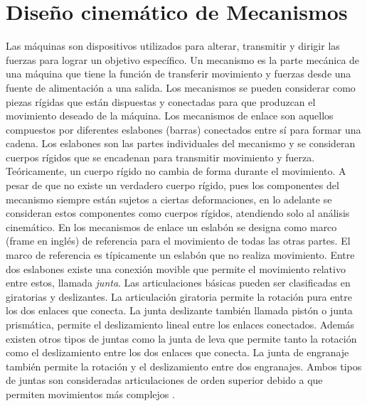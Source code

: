 \section{Diseño cinemático de Mecanismos}\label{sec: Diseño cinemático de Mecanismos}
Las máquinas son dispositivos utilizados para alterar, transmitir y dirigir las fuerzas para lograr un objetivo específico. Un mecanismo es la parte mecánica de una máquina que tiene la función de transferir movimiento y fuerzas desde una fuente de alimentación a una salida. Los mecanismos se pueden considerar como piezas rígidas que están dispuestas y conectadas para que produzcan el movimiento deseado de la máquina. Los mecanismos de enlace son aquellos compuestos por diferentes eslabones (barras) conectados entre sí para formar una cadena. Los eslabones son las partes individuales del mecanismo y se consideran cuerpos rígidos que se encadenan  para transmitir movimiento y fuerza. Teóricamente, un cuerpo rígido no cambia de forma durante el movimiento. A pesar de que no existe un verdadero cuerpo rígido, pues los componentes del mecanismo siempre están sujetos a ciertas deformaciones, en lo adelante se consideran estos componentes como cuerpos rígidos, atendiendo solo al análisis cinemático. En los mecanismos de enlace un eslabón se designa como marco (frame en inglés) de referencia para el movimiento de todas las otras partes. El marco de referencia es típicamente un eslabón que no realiza movimiento. Entre dos eslabones existe una conexión movible que permite el movimiento relativo entre estos, llamada \textit{junta}. Las articulaciones básicas pueden ser clasificadas en giratorias y deslizantes. La articulación giratoria permite la rotación pura entre los dos enlaces que conecta. La junta deslizante también llamada pistón o junta prismática, permite el deslizamiento lineal entre los enlaces conectados. Además existen otros tipos de juntas como la junta de leva que permite tanto la rotación como el deslizamiento entre los dos enlaces que conecta. La junta de engranaje también permite la rotación y el deslizamiento entre dos engranajes. Ambos tipos de juntas son consideradas articulaciones de orden superior debido a que permiten movimientos más complejos \cite{myszka2004machines}.

